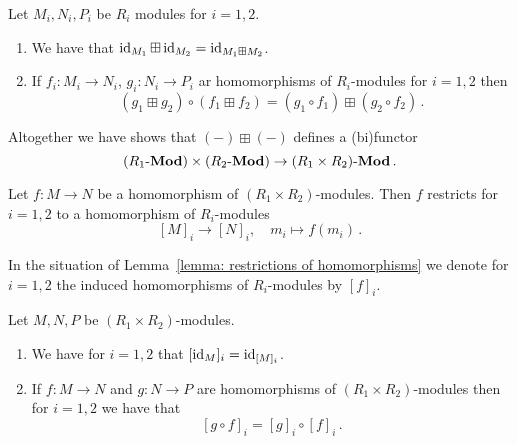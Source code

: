 \begin{lemma}
  Let $M_i, N_i, P_i$ be $R_i$ modules for $i = 1, 2$.
  \begin{enumerate}
    \item
      We have that $\operatorname{id}_{M_1} \boxplus \operatorname{id}_{M_2} = \operatorname{id}_{M_1 \boxplus M_2}$.
    \item
      If $f_i \colon M_i \to N_i$, $g_i \colon N_i \to P_i$ ar homomorphisms of $R_i$-modules for $i = 1, 2$ then
      \[
          (g_1 \boxplus g_2) \circ (f_1 \boxplus f_2)
        = (g_1 \circ f_1) \boxplus (g_2 \circ f_2) \,.
      \]
  \end{enumerate}
\end{lemma}




\begin{remark}
  \label{remark: functor out of product}
  Altogether we have shows that $(-) \boxplus (-)$ defines a (bi)functor
  \[
        (R_1\text{-}\mathbf{Mod}) \times (R_2\text{-}\mathbf{Mod})
    \to (R_1 \times R_2)\text{-}\mathbf{Mod} \,.
  \]
\end{remark}


\begin{lemma}
  \label{lemma: restrictions of homomorphisms}
  Let $f \colon M \to N$ be a homomorphism of $(R_1 \times R_2)$-modules.
  Then $f$ restricts for $i = 1, 2$ to a homomorphism of $R_i$-modules
  \[
            [M]_i
    \to     [N]_i,
    \quad   m_i
    \mapsto f(m_i) \,.
  \]
\end{lemma}




\begin{definition}
  In the situation of Lemma~\ref{lemma: restrictions of homomorphisms} we denote for $i = 1, 2$ the induced homomorphisms of $R_i$-modules by $[f]_i$.
\end{definition}


\begin{lemma}
  Let $M, N, P$ be $(R_1 \times R_2)$-modules.
  \begin{enumerate}
    \item
      We have for $i = 1, 2$ that $[\operatorname{id}_M]_i = \operatorname{id}_{[M]_i}$.
    \item
      If $f \colon M \to N$ and $g \colon N \to P$ are homomorphisms of $(R_1 \times R_2)$-modules then for $i = 1, 2$ we have that
      \[
          [g \circ f]_i
        = [g]_i \circ [f]_i \,.
      \]
  \end{enumerate}
\end{lemma}


